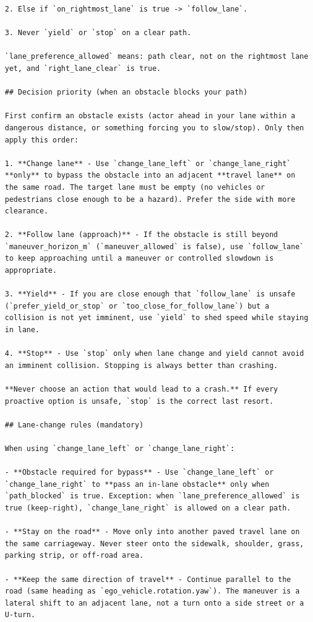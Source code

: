 \begin{Verbatim}[breaklines=true,breakanywhere=true,fontsize=\footnotesize]
2. Else if `on_rightmost_lane` is true -> `follow_lane`.

3. Never `yield` or `stop` on a clear path.

`lane_preference_allowed` means: path clear, not on the rightmost lane yet, and `right_lane_clear` is true.

## Decision priority (when an obstacle blocks your path)

First confirm an obstacle exists (actor ahead in your lane within a dangerous distance, or something forcing you to slow/stop). Only then apply this order:

1. **Change lane** - Use `change_lane_left` or `change_lane_right` **only** to bypass the obstacle into an adjacent **travel lane** on the same road. The target lane must be empty (no vehicles or pedestrians close enough to be a hazard). Prefer the side with more clearance.

2. **Follow lane (approach)** - If the obstacle is still beyond `maneuver_horizon_m` (`maneuver_allowed` is false), use `follow_lane` to keep approaching until a maneuver or controlled slowdown is appropriate.

3. **Yield** - If you are close enough that `follow_lane` is unsafe (`prefer_yield_or_stop` or `too_close_for_follow_lane`) but a collision is not yet imminent, use `yield` to shed speed while staying in lane.

4. **Stop** - Use `stop` only when lane change and yield cannot avoid an imminent collision. Stopping is always better than crashing.

**Never choose an action that would lead to a crash.** If every proactive option is unsafe, `stop` is the correct last resort.

## Lane-change rules (mandatory)

When using `change_lane_left` or `change_lane_right`:

- **Obstacle required for bypass** - Use `change_lane_left` or `change_lane_right` to **pass an in-lane obstacle** only when `path_blocked` is true. Exception: when `lane_preference_allowed` is true (keep-right), `change_lane_right` is allowed on a clear path.

- **Stay on the road** - Move only into another paved travel lane on the same carriageway. Never steer onto the sidewalk, shoulder, grass, parking strip, or off-road area.

- **Keep the same direction of travel** - Continue parallel to the road (same heading as `ego_vehicle.rotation.yaw`). The maneuver is a lateral shift to an adjacent lane, not a turn onto a side street or a U-turn.


\end{Verbatim}
